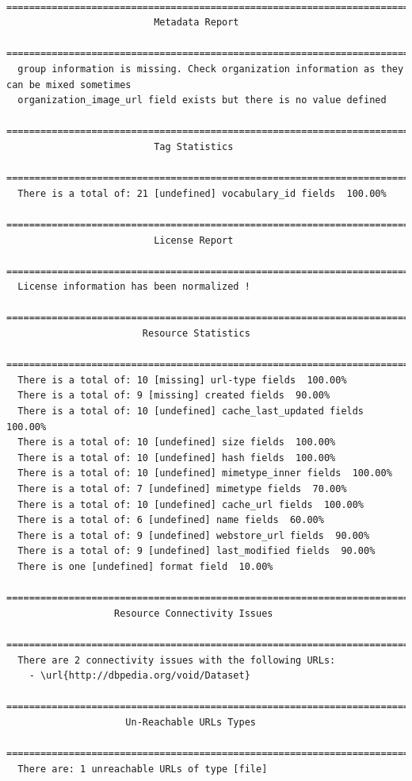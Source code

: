 \documentclass[runningheads,a4paper]{llncs}
\begin{document}
\begin{lstlisting}
 =======================================================================
                          Metadata Report
 =======================================================================
  group information is missing. Check organization information as they can be mixed sometimes
  organization_image_url field exists but there is no value defined
 =======================================================================
                          Tag Statistics
 =======================================================================
  There is a total of: 21 [undefined] vocabulary_id fields  100.00%
 =======================================================================
                          License Report
 =======================================================================
  License information has been normalized !
 =======================================================================
                        Resource Statistics
 =======================================================================
  There is a total of: 10 [missing] url-type fields  100.00%
  There is a total of: 9 [missing] created fields  90.00%
  There is a total of: 10 [undefined] cache_last_updated fields  100.00%
  There is a total of: 10 [undefined] size fields  100.00%
  There is a total of: 10 [undefined] hash fields  100.00%
  There is a total of: 10 [undefined] mimetype_inner fields  100.00%
  There is a total of: 7 [undefined] mimetype fields  70.00%
  There is a total of: 10 [undefined] cache_url fields  100.00%
  There is a total of: 6 [undefined] name fields  60.00%
  There is a total of: 9 [undefined] webstore_url fields  90.00%
  There is a total of: 9 [undefined] last_modified fields  90.00%
  There is one [undefined] format field  10.00%
 =======================================================================
                   Resource Connectivity Issues
 =======================================================================
  There are 2 connectivity issues with the following URLs:
    - \url{http://dbpedia.org/void/Dataset}
 =======================================================================
                     Un-Reachable URLs Types
 =======================================================================
  There are: 1 unreachable URLs of type [file]
\end{lstlisting}
\end{document}
